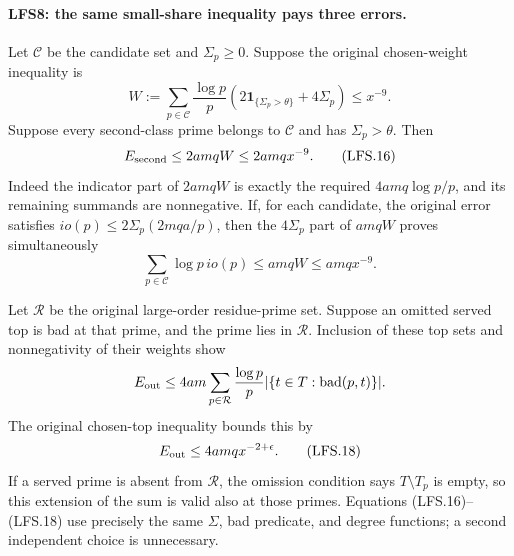 \paragraph{LFS8: the same small-share inequality pays three errors.}
\label{claim:LFS8}
Let $\mathcal C$ be the candidate set and $\Sigma_p\ge0$.
Suppose the original chosen-weight inequality is
\[
 W:=\sum_{p\in\mathcal C}\frac{\log p}{p}
    \left(2\mathbf1_{\{\Sigma_p>\theta\}}+4\Sigma_p\right)
       \le x^{-9}.                                      \tag{LFS.15}
\]
Suppose every second-class prime belongs to $\mathcal C$ and has
$\Sigma_p>\theta$.  Then
\[
 E_{\rm second}\le2amqW\le2amq x^{-9}.                  \tag{LFS.16}
\]
Indeed the indicator part of $2amqW$ is exactly the required
$4amq\log p/p$, and its remaining summands are nonnegative.
If, for each candidate, the original error satisfies
$io(p)\le2\Sigma_p(2mqa/p)$, then the $4\Sigma_p$ part of
$amqW$ proves simultaneously
\[
 \sum_{p\in\mathcal C}\log p\,io(p)
       \le amqW\le amq x^{-9}.                          \tag{LFS.17}
\]

Let $\mathcal R$ be the original large-order residue-prime set.
Suppose an omitted served top is bad at that prime, and the prime
lies in $\mathcal R$.  Inclusion of these top sets and nonnegativity
of their weights show
\[
 E_{\rm out}\le4am\sum_{p\in\mathcal R}\frac{\log p}{p}
                         |\{t\in T:\mathrm{bad}(p,t)\}|.
\]
The original chosen-top inequality bounds this by
\[
                      E_{\rm out}\le4amq x^{-2+\epsilon}.
                                                               \tag{LFS.18}
\]
If a served prime is absent from $\mathcal R$, the omission
condition says $T\setminus T_p$ is empty, so this extension of
the sum is valid also at those primes.  Equations
(LFS.16)--(LFS.18) use precisely the same $\Sigma$, bad predicate,
and degree functions; a second independent choice is unnecessary.

